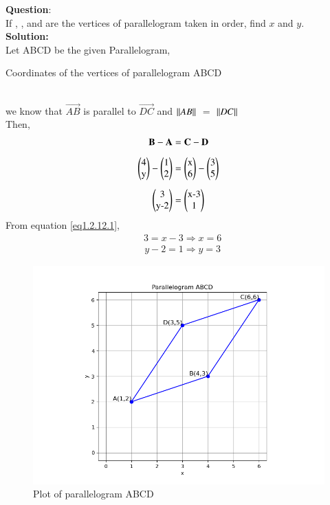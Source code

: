 \documentclass[journal]{IEEEtran}
\begin{document}
\textbf{Question}:\vspace{.5em} \\ If , ,  and  are the vertices of parallelogram taken in order, find $x$ and $y$.\vspace{.5em} \\  \textbf{Solution:} \\ \hspace {0.5em} Let ABCD be the given Parallelogram, \\ 
\begin{table}[h!]
\centering
    \caption{Coordinates of the vertices of parallelogram ABCD}

\end{table}
 \\ we know that $\vec{AB}$ is parallel to $\vec{DC}$ and  $\left\vert\left\vert AB\right\vert\right\vert$ $=$ $\left\vert\left\vert DC\right\vert\right\vert$ \\ Then,
\begin{align}
	\vec{B}-\vec{A}&=\vec{C}-\vec{D}\\[.5em]
\myvec{4 \\ $y$}-\myvec{1 \\ 2}&=\myvec{$x$ \\ 6}-\myvec{3 \\ 5}\\[0.5em] 
\myvec{3 \\ $y-2$}&=\myvec{$x-3$ \\ 1}\label{eq1.2.12.1} \end{align}
\hspace{8em} From equation\hspace{0.5em} \eqref{eq1.2.12.1}, \begin{align} &3=x-3	\Rightarrow x=6  \end{align} \begin{align} &y-2=1 \Rightarrow y=3\end{align}
\begin{figure}[h!]
   \centering \includegraphics[width=0.7\linewidth]{figs/Figure_1.png}
   \caption{Plot of parallelogram ABCD}
   \label{Parallelogram}
\end{figure}
\end{document}
